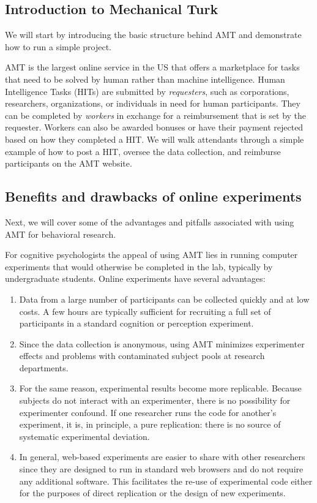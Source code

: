 \documentclass[10pt,letterpaper]{article}
\begin{document}
\subsection{Introduction to Mechanical Turk}
We will start by introducing the basic structure behind AMT and demonstrate how
to run a simple project.

AMT is the largest online service in the US that offers a marketplace for tasks
that need to be solved by human rather than machine intelligence. Human
Intelligence Tasks (HITs) are submitted by \emph{requesters}, such as
corporations, researchers, organizations, or individuals in need for human
participants.  They can be completed by \emph{workers} in exchange for a
reimbursement that is set by the requester. Workers can also be awarded bonuses
or have their payment rejected based on how they completed a {HIT}. We will walk
attendants through a simple example of how to post a HIT, oversee the data
collection, and reimburse participants on the AMT website.


\subsection{Benefits and drawbacks of online experiments}
Next, we will cover some of the advantages and pitfalls associated with using AMT
for behavioral research.

For cognitive psychologists the appeal of using AMT lies in running computer
experiments that would otherwise be completed in the lab, typically by
undergraduate students. Online experiments have several advantages:
\begin{enumerate}
\item
    Data from a large number of participants can be collected  quickly and at low
    costs.  A few hours are typically sufficient for recruiting a full set of participants in a standard cognition or
    perception experiment.
\item
    Since the data collection is anonymous, using AMT minimizes experimenter
    effects and problems with contaminated subject pools at research departments.
\item 
    For the same reason, experimental results become more replicable. Because
    subjects do not interact with an experimenter, there is no possibility for
    experimenter confound. If one researcher runs the code for another's
    experiment, it is, in principle, a pure replication: there is no source of
    systematic experimental deviation.
\item 
	In general, web-based experiments are easier to share with other researchers since they are designed to run in standard web browsers and do not require any additional software. This facilitates the re-use of experimental code either for the purposes of direct replication or the design of new experiments.
\end{enumerate}
\end{document}
